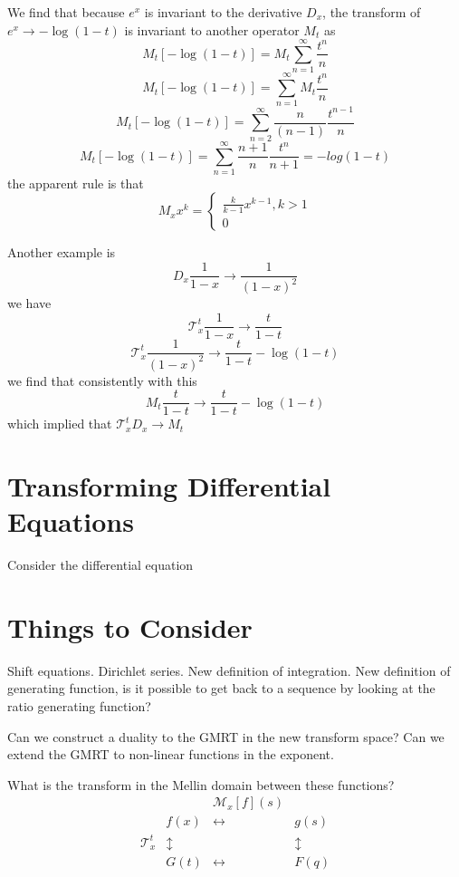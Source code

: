 \documentclass{article}
\begin{document}
We find that because $e^x$ is invariant to the derivative $D_x$, the transform of $e^x \to -\log(1-t)$ is invariant to another operator $M_t$ as
\begin{equation}
M_t[-\log(1-t)] = M_t \sum_{n=1}^\infty \frac{t^n}{n}
\end{equation}
\begin{equation}
M_t[-\log(1-t)] =\sum_{n=1}^\infty  M_t \frac{t^n}{n}
\end{equation}
\begin{equation}
M_t[-\log(1-t)] =\sum_{n=2}^\infty  \frac{n}{(n-1)}\frac{t^{n-1}}{n}
\end{equation}
\begin{equation}
M_t[-\log(1-t)] =\sum_{n=1}^\infty  \frac{n+1}{n}\frac{t^{n}}{n+1} = -log(1-t)
\end{equation}
the apparent rule is that
$$
M_x x^k = \begin{cases} \frac{k}{k-1} x^{k-1}, k>1 \\ 0\end{cases}
$$

Another example is 
$$
D_x \frac{1}{1-x} \to \frac{1}{(1-x)^2}
$$
we have 
$$
\mathcal{T}_x^t \frac{1}{1-x} \to \frac{t}{1-t}
$$
$$
\mathcal{T}_x^t \frac{1}{(1-x)^2} \to \frac{t}{1-t} - \log(1-t)
$$
we find that consistently with this
$$
M_t \frac{t}{1-t} \to \frac{t}{1-t} - \log(1-t)
$$
which implied that $\mathcal{T}_x^t D_x \to M_t$


\section{Transforming Differential Equations}
Consider the differential equation

\section{Things to Consider}
Shift equations. Dirichlet series. New definition of integration. New definition of generating function, is it possible to get back to a sequence by looking at the ratio generating function?

Can we construct a duality to the GMRT in the new transform space?
Can we extend the GMRT to non-linear functions in the exponent.

What is the transform in the Mellin domain between these functions?
\begin{equation}
\begin{matrix}
 &      & \mathcal{M}_x[f](s) & \\
 & f(x) & \leftrightarrow & g(s) \\
 \mathcal{T}_x^t & \updownarrow & & \updownarrow \\
 & G(t) & \leftrightarrow & F(q)
\end{matrix}
\end{equation}
\end{document}
